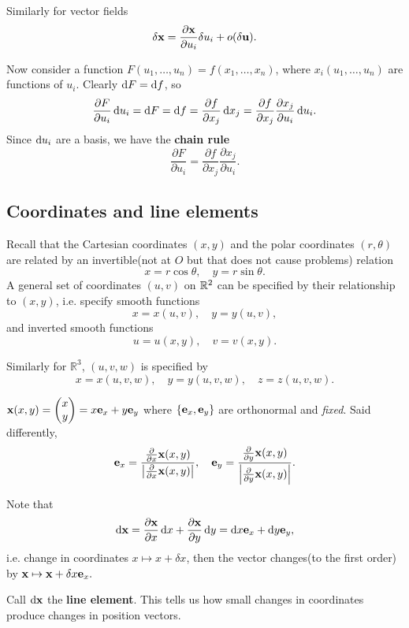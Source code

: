 Similarly for vector fields
\[
    \delta{\bf x} = \frac{\partial {\bf x}}{\partial u_i}\delta u_i+o(\delta{\bf u}). 
\]

Now consider a function $ F(u_1,\dots,u_n)=f(x_1,\dots,x_n) $, where $ x_i(u_1,\dots,u_n) $ are functions of $u_i$. Clearly $ \mathrm{d} F=\mathrm{d} f $, so 
\[
    \frac{\partial F}{\partial u_i} \,\mathrm{d} u_i=\mathrm{d} F = \mathrm{d} f= \frac{\partial f}{\partial x_j}\,\mathrm{d} x_j = \frac{\partial f}{\partial x_j}\frac{\partial x_j}{\partial u_i}\,\mathrm{d} u_i.  
\]
Since $\mathrm{d} u_i$ are a basis, we have the \textbf{chain rule}
\[
    \frac{\partial F}{\partial u_i}=\frac{\partial f}{\partial x_j}\frac{\partial x_j}{\partial u_i}.
\]

\subsection{Coordinates and line elements}
Recall that the Cartesian coordinates $ (x,y) $ and the polar coordinates $ (r,\theta) $ are related by an invertible(not at $O$ but that does not cause problems) relation
\[
    x=r \cos \theta,\quad y= r\sin \theta.
\]
A general set of coordinates $ (u,v) $ on ${\mathbb{R}}^2$ can be specified by their relationship to $(x,y)$, i.e. specify smooth functions
\[
    x=x(u,v),\quad y=y(u,v),
\]
and inverted smooth functions 
\[
    u=u(x,y),\quad v=v(x,y).
\]

Similarly for $ \mathbb{R}^{3} $, $(u,v,w)$ is specified by 
\[
    x=x(u,v,w),\quad y=y(u,v,w),\quad z=z(u,v,w).
\]

\begin{example}
    $ {\bf x}(x,y)=\begin{pmatrix}
        x \\ y
    \end{pmatrix}=x{\bf e}_x+y{\bf e}_y $ where $ \{{\bf e}_x,{\bf e}_y\} $ are orthonormal and \textit{fixed}. Said differently,
    \[
        {\bf e}_x = \frac{\frac{\partial }{\partial x}{\bf x}(x,y) }{\left| \frac{\partial }{\partial x}{\bf x}(x,y) \right| },\quad {\bf e}_y=\frac{\frac{\partial }{\partial y}{\bf x}(x,y) }{\left| \frac{\partial }{\partial y}{\bf x}(x,y) \right| }.
    \]
\end{example}

Note that 
\[
    \mathrm{d} {\bf x}=\frac{\partial {\bf x}}{\partial x}\,\mathrm{d} x+\frac{\partial {\bf x}}{\partial y}\,\mathrm{d} y=\mathrm{d} x{\bf e}_x+\mathrm{d} y{\bf e}_y,  
\]
i.e. change in coordinates $ x \mapsto x+\delta x $, then the vector changes(to the first order) by $ {\bf x} \mapsto {\bf x}+\delta x{\bf e}_x .$

\begin{definition}
    Call $ \mathrm{d} {\bf x} $ the \textbf{line element}. This tells us how small changes in coordinates produce changes in position vectors.
\end{definition}

